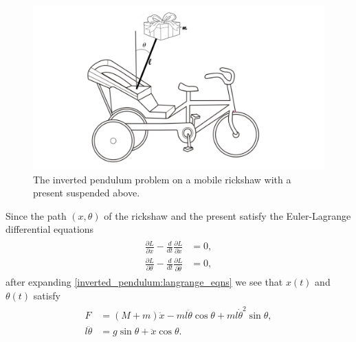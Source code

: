 \begin{figure}
\centering
\includegraphics[width=\textwidth]{rickshaw_img.pdf}
\caption{The inverted pendulum problem on a mobile rickshaw with a present suspended above.
}
\label{fig:inverted_pendulum:rickshaw_diagram}
\end{figure}

Since the path $(x,\theta)$ of the rickshaw and the present satisfy the Euler-Lagrange differential equations 
\begin{align}
	\begin{split}
\frac{\partial L}{\partial x} - \frac{d}{dt} \frac{\partial L}{\partial \dot{x}} &= 0,\\
\frac{\partial L}{\partial \theta} - \frac{d}{dt} \frac{\partial L}{\partial \dot{\theta}} &= 0,
	\end{split}\label{inverted_pendulum:langrange_eqns}
\end{align}
after expanding \eqref{inverted_pendulum:langrange_eqns} we see that $x(t)$ and $\theta(t)$ satisfy
\begin{align}
	\begin{split}
		F &= (M + m)\ddot{x} - ml\ddot{\theta} \cos \theta + ml \dot{\theta}^2 \sin \theta,\\
		l \ddot{\theta} &= g \sin \theta + \ddot{x} \cos \theta.
	\end{split}\label{inverted_pendulum:langrange_eqns_explicit}
\end{align}



